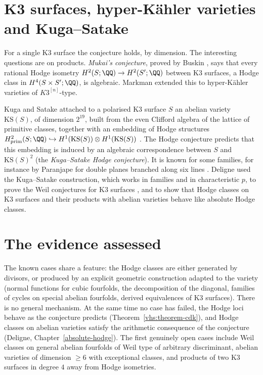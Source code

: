 \section{K3 surfaces, hyper-K\"ahler varieties and Kuga--Satake}\label{known-cases:section-k3}

\begin{remark}\label{known-cases:remark-k3}
For a single K3 surface the conjecture holds, by dimension. The interesting questions are on products. \emph{Mukai's conjecture}, proved by Buskin \cite{buskin-2019}, says that every rational Hodge
isometry $H^2(S; \QQ) \to H^2(S'; \QQ)$ between K3 surfaces, a Hodge class in $H^4(S \times S'; \QQ)$, is algebraic. Markman extended this to hyper-K\"ahler varieties of $K3^{[n]}$-type.
\end{remark}

\begin{remark}\label{known-cases:remark-kuga-satake}
Kuga and Satake attached to a polarised K3 surface $S$ an abelian variety $\mathrm{KS}(S)$, of dimension $2^{19}$, built from the even Clifford algebra of the lattice of primitive classes, together with
an embedding of Hodge structures $H^2_{\mathrm{prim}}(S; \QQ) \hookrightarrow H^1(\mathrm{KS}(S)) \otimes H^1(\mathrm{KS}(S))$ \cite{kuga-satake-1967}. The Hodge conjecture predicts that this embedding is
induced by an algebraic correspondence between $S$ and $\mathrm{KS}(S)^2$ (the \emph{Kuga--Satake Hodge conjecture}). It is known for some families, for instance by Paranjape for double planes branched
along six lines \cite{paranjape-1988}. Deligne used the Kuga--Satake construction, which works in families and in characteristic $p$, to prove the Weil conjectures for K3 surfaces
\cite{deligne-k3}, and to show that Hodge classes on K3 surfaces and their products with abelian varieties behave like absolute Hodge classes.
\end{remark}

\section{The evidence assessed}\label{known-cases:section-assessment}

\begin{remark}\label{known-cases:remark-assessment}
The known cases share a feature: the Hodge classes are either generated by divisors, or produced by an explicit geometric construction adapted to the variety (normal functions for cubic fourfolds,
the decomposition of the diagonal, families of cycles on special abelian fourfolds, derived equivalences of K3 surfaces). There is no general mechanism. At the same time no case has failed, the
Hodge loci behave as the conjecture predicts (Theorem~\ref{vhs:theorem-cdk}), and Hodge classes on abelian varieties satisfy the arithmetic consequence of the conjecture (Deligne,
Chapter~\ref{absolute-hodge}). The first genuinely open cases include Weil classes on general abelian fourfolds of Weil type of arbitrary discriminant, abelian varieties of dimension $\geq 6$ with
exceptional classes, and products of two K3 surfaces in degree $4$ away from Hodge isometries.
\end{remark}

